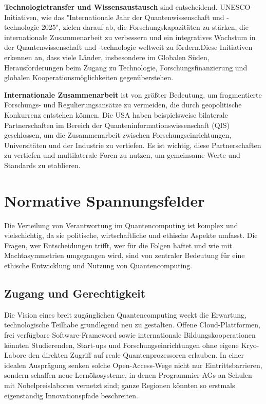 \textbf{Technologietransfer und Wissensaustausch} sind entscheidend. UNESCO-Initiativen, wie das "Internationale Jahr der Quantenwissenschaft und -technologie 2025", zielen darauf ab, die Forschungskapazitäten zu stärken, die internationale Zusammenarbeit zu verbessern und ein integratives Wachstum in der Quantenwissenschaft und -technologie weltweit zu fördern.Diese Initiativen erkennen an, dass viele Länder, insbesondere im Globalen Süden, Herausforderungen beim Zugang zu Technologie, Forschungsfinanzierung und globalen Kooperationsmöglichkeiten gegenüberstehen.\cite{noauthor_participate_nodate}

\textbf{Internationale Zusammenarbeit} ist von größter Bedeutung, um fragmentierte Forschungs- und Regulierungsansätze zu vermeiden, die durch geopolitische Konkurrenz entstehen können. Die USA haben beispielsweise bilaterale Partnerschaften im Bereich der Quanteninformationswissenschaft (QIS) geschlossen, um die Zusammenarbeit zwischen Forschungseinrichtungen, Universitäten und der Industrie zu vertiefen.\cite{noauthor_us_nodate} Es ist wichtig, diese Partnerschaften zu vertiefen und multilaterale Foren zu nutzen, um gemeinsame Werte und Standards zu etablieren.\cite{noauthor_quantum_nodate-7}



\section{Normative Spannungsfelder  }
Die Verteilung von Verantwortung im Quantencomputing ist komplex und vielschichtig, da sie politische, wirtschaftliche und ethische Aspekte umfasst. Die Fragen, wer Entscheidungen trifft, wer für die Folgen haftet und wie mit Machtasymmetrien umgegangen wird, sind von zentraler Bedeutung für eine ethische Entwicklung und Nutzung von Quantencomputing.

\subsection{Zugang und Gerechtigkeit}


Die Vision eines breit zugänglichen Quantencomputing weckt die Erwartung, technologische Teilhabe grundlegend neu zu gestalten. Offene Cloud-Plattformen, frei verfügbare Software-Frameword sowie internationale Bildungskooperationen könnten Studierenden, Start-ups und Forschungseinrichtungen ohne eigene Kryo-Labore den direkten Zugriff auf reale Quantenprozessoren erlauben. In einer idealen Ausprägung senken solche Open-Access-Wege nicht nur Eintrittsbarrieren, sondern schaffen neue Lernökosysteme, in denen Programmier-AGs an Schulen mit Nobelpreislaboren vernetzt sind; ganze Regionen könnten so erstmals eigenständig Innovationspfade beschreiten.

